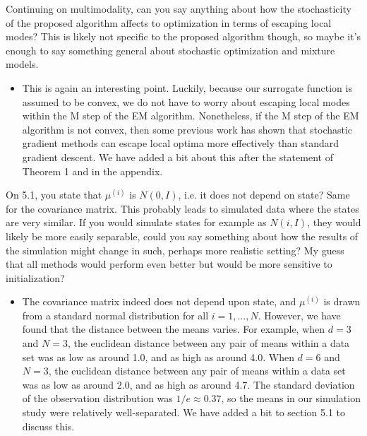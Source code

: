 \documentclass[11pt]{article}
\begin{document}
Continuing on multimodality, can you say anything about how the stochasticity of the proposed algorithm affects to optimization in terms of escaping local modes? This is likely not specific to the proposed algorithm though, so maybe it's enough to say something general about stochastic optimization and mixture models.

\begin{itemize}
    \item This is again an interesting point. Luckily, because our surrogate function is assumed to be convex, we do not have to worry about escaping local modes within the M step of the EM algorithm. %
    Nonetheless, if the M step of the EM algorithm is not convex, then some previous work has shown that stochastic gradient methods can escape local optima more effectively than standard gradient descent. We have added a bit about this after the statement of Theorem 1 and in the appendix.
\end{itemize}

On 5.1, you state that $\mu^{(i)}$ is $N(0, I)$, i.e. it does not depend on state? Same for the covariance matrix. This probably leads to simulated data where the states are very similar. If you would simulate states for example as $N(i, I)$, they would likely be more easily separable, could you say something about how the results of the simulation might change in such, perhaps more realistic setting? My guess that all methods would perform even better but would be more sensitive to initialization?

\begin{itemize}
    \item The covariance matrix indeed does not depend upon state, and $\mu^{(i)}$ is drawn from a standard normal distribution for all $i = 1,\ldots,N$. However, we have found that the distance between the means varies. For example, when $d = 3$ and $N = 3$, the euclidean distance between any pair of means within a data set was as low as around 1.0, and as high as around 4.0. When $d = 6$ and $N = 3$, the euclidean distance between any pair of means within a data set was as low as around 2.0, and as high as around 4.7. The standard deviation of the observation distribution was $1/e \approx 0.37$, so the means in our simulation study were relatively well-separated. We have added a bit to section 5.1 to discuss this.
\end{itemize}
\end{document}
